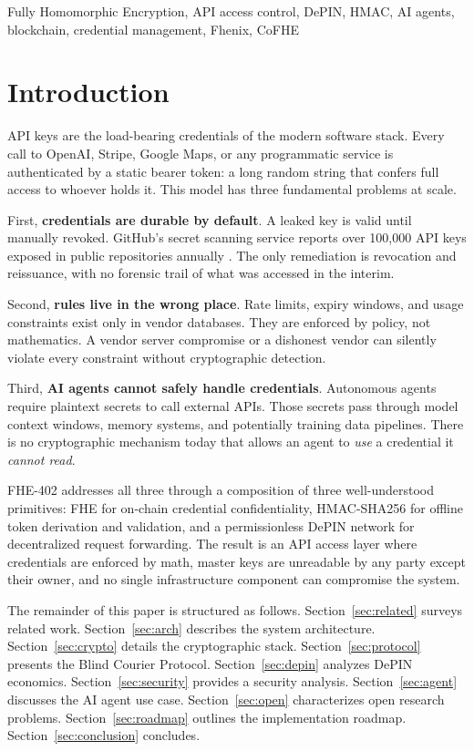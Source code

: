 \documentclass[conference]{IEEEtran}
\begin{document}
\begin{IEEEkeywords}
Fully Homomorphic Encryption, API access control, DePIN, HMAC, AI agents, blockchain,
credential management, Fhenix, CoFHE
\end{IEEEkeywords}

\section{Introduction}

API keys are the load-bearing credentials of the modern software stack. Every call
to OpenAI, Stripe, Google Maps, or any programmatic service is authenticated by a
static bearer token: a long random string that confers full access to whoever holds it.
This model has three fundamental problems at scale.

First, \textbf{credentials are durable by default}. A leaked key is valid until
manually revoked. GitHub's secret scanning service reports over 100,000 API keys
exposed in public repositories annually \cite{github_secrets}. The only remediation
is revocation and reissuance, with no forensic trail of what was accessed in the
interim.

Second, \textbf{rules live in the wrong place}. Rate limits, expiry windows, and
usage constraints exist only in vendor databases. They are enforced by policy, not
mathematics. A vendor server compromise or a dishonest vendor can silently violate
every constraint without cryptographic detection.

Third, \textbf{AI agents cannot safely handle credentials}. Autonomous agents
require plaintext secrets to call external APIs. Those secrets pass through model
context windows, memory systems, and potentially training data pipelines. There is
no cryptographic mechanism today that allows an agent to \emph{use} a credential it
\emph{cannot read}.

FHE-402 addresses all three through a composition of three well-understood primitives:
FHE for on-chain credential confidentiality, HMAC-SHA256 for offline token derivation
and validation, and a permissionless DePIN network for decentralized request forwarding.
The result is an API access layer where credentials are enforced by math, master keys are
unreadable by any party except their owner, and no single infrastructure component can
compromise the system.

The remainder of this paper is structured as follows. Section~\ref{sec:related} surveys
related work. Section~\ref{sec:arch} describes the system architecture. Section~\ref{sec:crypto}
details the cryptographic stack. Section~\ref{sec:protocol} presents the Blind Courier
Protocol. Section~\ref{sec:depin} analyzes DePIN economics. Section~\ref{sec:security}
provides a security analysis. Section~\ref{sec:agent} discusses the AI agent use case.
Section~\ref{sec:open} characterizes open research problems. Section~\ref{sec:roadmap}
outlines the implementation roadmap. Section~\ref{sec:conclusion} concludes.
\end{document}
